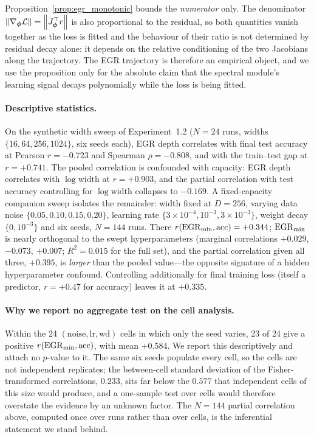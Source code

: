 \begin{remark}
\label{rem:egr_ratio_caveat}
Proposition~\ref{prop:egr_monotonic} bounds the \emph{numerator} only. The
denominator $\left\lVert\nabla_{\boldsymbol{\phi}} \mathcal{L}\right\rVert = \left\lVert J_{\boldsymbol{\phi}}^\top r\right\rVert$ is also
proportional to the residual, so both quantities vanish together as the loss
is fitted and the behaviour of their ratio is not determined by residual
decay alone: it depends on the relative conditioning of the two Jacobians
along the trajectory. The EGR trajectory is therefore an empirical object,
and we use the proposition only for the absolute claim that the spectral
module's learning signal decays polynomially while the loss is being
fitted.
\end{remark}

\paragraph{Descriptive statistics.}
On the synthetic width sweep of Experiment~1.2 ($N = 24$ runs, widths
$\{16, 64, 256, 1024\}$, six seeds each), EGR depth correlates with final
test accuracy at Pearson $r = -0.723$ and Spearman $\rho = -0.808$, and with
the train--test gap at $r = +0.741$. The pooled correlation is confounded
with capacity: EGR depth correlates with $\log \mathrm{width}$ at
$r = +0.903$, and the partial correlation with test accuracy controlling for
$\log \mathrm{width}$ collapses to $-0.169$. A fixed-capacity companion
sweep isolates the remainder: width fixed at $D = 256$, varying data noise
$\{0.05, 0.10, 0.15, 0.20\}$, learning rate
$\{3{\times}10^{-4}, 10^{-3}, 3{\times}10^{-3}\}$, weight decay
$\{0, 10^{-3}\}$ and six seeds, $N = 144$ runs. There
$r(\mathrm{EGR}_{\min}, \mathrm{acc}) = +0.344$; $\mathrm{EGR}_{\min}$ is nearly orthogonal
to the swept hyperparameters (marginal correlations $+0.029$, $-0.073$,
$+0.007$; $R^2 = 0.015$ for the full set), and the partial correlation given
all three, $+0.395$, is \emph{larger} than the pooled value---the opposite
signature of a hidden hyperparameter confound. Controlling additionally for
final training loss (itself a predictor, $r = +0.47$ for accuracy) leaves it
at $+0.335$.

\paragraph{Why we report no aggregate test on the cell analysis.}
Within the 24 $(\mathrm{noise}, \mathrm{lr}, \mathrm{wd})$ cells in which
only the seed varies, 23 of 24 give a positive
$r(\mathrm{EGR}_{\min}, \mathrm{acc})$, with mean $+0.584$. We report this
descriptively and attach no $p$-value to it. The same six seeds populate
every cell, so the cells are not independent replicates; the between-cell
standard deviation of the Fisher-transformed correlations, $0.233$, sits far
below the $0.577$ that independent cells of this size would produce, and a
one-sample test over cells would therefore overstate the evidence by an
unknown factor. The $N = 144$ partial correlation above, computed once over
runs rather than over cells, is the inferential statement we stand behind.

